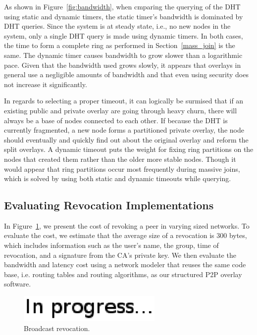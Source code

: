 \documentclass[conference]{IEEEtran}
\begin{document}
As shown in Figure~\ref{fig:bandwidth}, when cmparing the querying of the DHT
using static and dynamic timers, the static timer's bandwidth is dominated by
DHT queries.  Since the system is at steady state, i.e., no new nodes in the
system, only a single DHT query is made using dynamic timers.  In both cases,
the time to form a complete ring as performed in Section~\ref{mass_join} is the
same. The dynamic timer causes bandwidth to grow slower than a logarithmic pace.
Given that the bandwidth used grows slowly, it appears that overlays in general
use a negligible amounts of bandwidth and that even using security does not
increase it significantly.

In regards to selecting a proper timeout, it can logically be surmised that
if an existing public and private overlay are going through heavy churn,
there will always be a base of nodes connected to each other.  If because the DHT
is currently fragmented, a new node forms a partitioned private overlay, the node
should eventually and quickly find out about the original overlay and reform
the split overlays.  A dynamic timeout puts the weight for fixing ring partitions
on the nodes that created them rather than the older more stable nodes.  Though
it would appear that ring partitions occur most frequently during massive joins,
which is solved by using both static and dynamic timeouts while querying.

\subsection{Evaluating Revocation Implementations}
\label{evaluation_revocation}
In Figure~\ref{fig:broadcast_revocation}, we present the cost of revoking a
peer in varying sized networks.  To evaluate the cost, we estimate that the
average size of a revocation is 300 bytes, which includes information such
as the user's name, the group, time of revocation, and a signature from the
CA's private key.  We then evaluate the bandwidth and latency cost using a
network modeler that reuses the same code base, i.e. routing tables and routing
algorithms, as our structured P2P overlay software.  

\begin{figure}[h]
\centering
\includegraphics[width=2.75in]{in_progress.eps}
\caption{Broadcast revocation.}
\label{fig:broadcast_revocation}
\end{figure}
\end{document}
